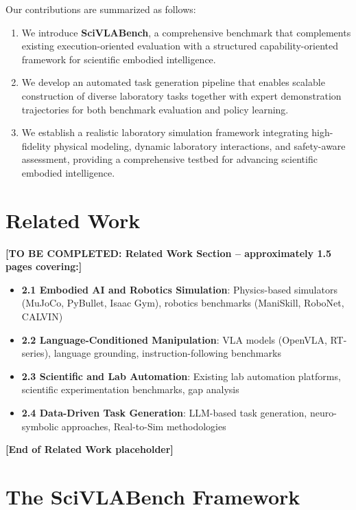 \documentclass[sigconf]{acmart}
\begin{document}
Our contributions are summarized as follows:

\begin{enumerate}
\item We introduce \textbf{SciVLABench}, a comprehensive benchmark that complements existing execution-oriented evaluation with a structured capability-oriented framework for scientific embodied intelligence.

\item We develop an automated task generation pipeline that enables scalable construction of diverse laboratory tasks together with expert demonstration trajectories for both benchmark evaluation and policy learning.

\item We establish a realistic laboratory simulation framework integrating high-fidelity physical modeling, dynamic laboratory interactions, and safety-aware assessment, providing a comprehensive testbed for advancing scientific embodied intelligence.
\end{enumerate}

\section{Related Work}
\label{sec:related}

\textbf{[TO BE COMPLETED: Related Work Section -- approximately 1.5 pages covering:]}

\begin{itemize}
    \item \textbf{2.1 Embodied AI and Robotics Simulation}: Physics-based simulators (MuJoCo, PyBullet, Isaac Gym), robotics benchmarks (ManiSkill, RoboNet, CALVIN)
    \item \textbf{2.2 Language-Conditioned Manipulation}: VLA models (OpenVLA, RT-series), language grounding, instruction-following benchmarks
    \item \textbf{2.3 Scientific and Lab Automation}: Existing lab automation platforms, scientific experimentation benchmarks, gap analysis
    \item \textbf{2.4 Data-Driven Task Generation}: LLM-based task generation, neuro-symbolic approaches, Real-to-Sim methodologies
\end{itemize}

\textbf{[End of Related Work placeholder]}

\section{The SciVLABench Framework}
\label{sec:framework}
\end{document}
